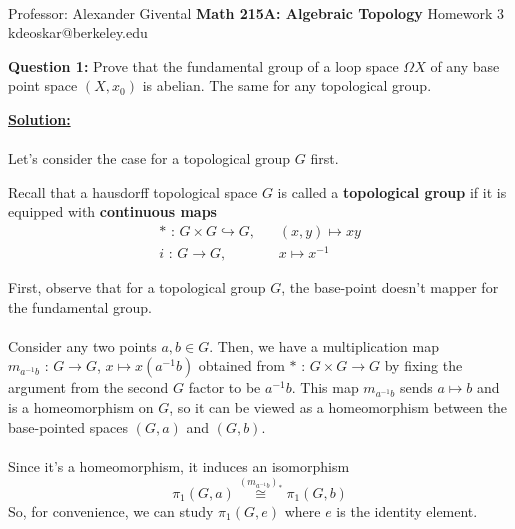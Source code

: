 \documentclass[11pt]{article}
\begin{document}
\thispagestyle{empty}
\bigskip \
\vspace{0.1cm}

\begin{center}
{\fontsize{22}{22} \selectfont Professor: Alexander Givental}
\vskip 16pt
{\fontsize{30}{30} \selectfont \bf \sffamily Math 215A: Algebraic Topology}
\vskip 24pt
{\fontsize{14}{14} \selectfont \rmfamily Homework 3} 
\vskip 6pt
{\fontsize{14}{14} \selectfont \ttfamily kdeoskar@berkeley.edu} 
\vskip 24pt
\end{center}



\begin{bluebox}
  \textbf{Question 1:} Prove that the fundamental group of a loop space $\Omega X$ of any base point space $(X, x_0)$ is abelian. The same for any topological group. 
\end{bluebox}

\vskip 0.5cm
\textbf{\underline{Solution:}}
\\
\\
Let's consider the case for a topological group $G$ first. 

\begin{redbox}
  Recall that a hausdorff topological space $G$ is called a \textbf{topological group} if it is equipped with \textbf{continuous maps} 
  \begin{align*}
    * \text{ : } G \times G \hookrightarrow G, \;\;\;&(x, y) \mapsto xy \\
    i \text{ : } G \rightarrow G, \;\;\;&x \mapsto x^{-1}
  \end{align*}
\end{redbox}

\begin{dottedbox}
  First, observe that for a topological group $G$, the base-point doesn't mapper for the fundamental group.
  \\
  \\
  Consider any two points $a, b \in G$. Then, we have a multiplication map $m_{a^{-1}b} \text{ : } G \rightarrow G$,  $x \mapsto x(a^{-1}b)$  obtained from $* \text{ : } G \times G \rightarrow G$ by fixing the argument from the second $G$ factor to be $ a^{-1}b$. This map $m_{a^{-1} b}$ sends $a \mapsto b$ and is a homeomorphism on $G$, so it can be viewed as a homeomorphism between the base-pointed spaces $(G, a)$ and $(G, b)$.
  \\
  \\
  Since it's a homeomorphism, it induces an isomorphism $$\pi_1(G, a) \overset{\left(m_{a^{-1} b}\right)_*}{\cong} \pi_1(G, b)$$
  So, for convenience, we can study $\pi_1(G, e)$ where $e$ is the identity element.
\end{dottedbox}
\end{document}
